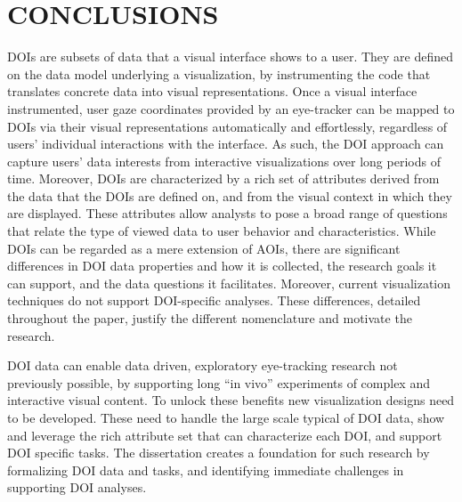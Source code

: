 \chapter{CONCLUSIONS}
\label{chap:Conclusion}
DOIs are subsets of data that a visual interface shows to a user. They are defined on the data model underlying a visualization, by instrumenting the code that translates concrete data into visual representations. Once a visual interface instrumented, user gaze coordinates provided by an eye-tracker can be mapped to DOIs via their visual representations automatically and effortlessly, regardless of users' individual interactions with the interface. As such, the DOI approach can capture users' data interests from interactive visualizations over long periods of time. Moreover, DOIs are characterized by a rich set of attributes derived from the data that the DOIs are defined on, and from the visual context in which they are displayed. These attributes allow analysts to pose a broad range of questions that relate the type of viewed data to user behavior and characteristics. While DOIs can be regarded as a mere extension of AOIs, there are significant differences in DOI data properties and how it is collected, the research goals it can support, and the data questions it facilitates. Moreover, current visualization techniques do not support DOI-specific analyses. These differences, detailed throughout the paper, justify the different nomenclature and motivate the research.    

DOI data can enable data driven, exploratory eye-tracking research not previously possible, by supporting long ``in vivo'' experiments of complex and interactive visual content. To unlock these benefits new visualization designs need to be developed. These need to handle the large scale typical of DOI data, show and leverage the rich attribute set that can characterize each DOI, and support DOI specific tasks. The dissertation creates a foundation for such research by formalizing DOI data and tasks, and identifying immediate challenges in supporting DOI analyses.